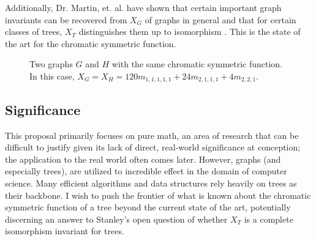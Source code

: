 \documentclass[a4paper,12pt]{article}
\begin{document}
\begin{spacing}{1}
Additionally, Dr. Martin, et. al. have shown that certain important graph invariants can be recovered from $X_G$ of graphs in general and that for certain classes of trees, $X_T$ distinguishes them up to isomorphism \cite{distinguishtrees}. This is the state of the art for the chromatic symmetric function.

\begin{figure}[t]
\begin{center}
\hspace{1cm}
\caption{Two graphs $G$ and $H$ with the same chromatic symmetric function. In this case, $X_G = X_H = 120m_{1,1,1,1,1} + 24m_{2,1,1,1} + 4m_{2,2,1}$.}
\end{center}
\end{figure}

\subsection*{Significance}
This proposal primarily focuses on pure math, an area of research that can be difficult to justify given its lack of direct, real-world significance at conception; the application to the real world often comes later. However, graphs (and especially trees), are utilized to incredible effect in the domain of computer science. Many efficient algorithms and data structures rely heavily on trees as their backbone. I wish to push the frontier of what is known about the chromatic symmetric function of a tree beyond the current state of the art, potentially discerning an answer to Stanley's open question of whether $X_T$ is a complete isomorphism invariant for trees.


\end{spacing}
\end{document}

